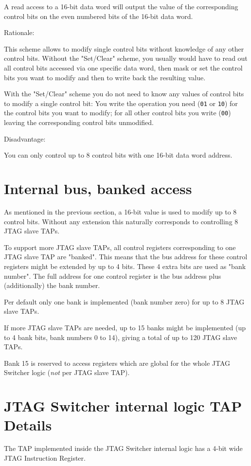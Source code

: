 \documentclass[10pt,english,a4paper]{report}
\begin{document}
A read access to a 16-bit data word will output the value of the corresponding control bits
on the even numbered bits of the 16-bit data word.

Rationale:

This scheme allows to modify single control bits without knowledge of any other control bits.
Without the "Set/Clear" scheme, you usually would have to read out all control bits
accessed via one specific data word, then mask or set the control bits you want to modify and
then to write back the resulting value.

With the "Set/Clear" scheme you do not need to know any values of control bits to modify
a single control bit: You write the operation you need ({\tt 01} or {\tt 10}) for the
control bits you want to modify; for all other control bits you write ({\tt 00}) leaving
the corresponding control bits unmodified.

Disadvantage:

You can only control up to 8 control bits with one 16-bit data word address.

\newpage
\section{Internal bus, banked access}
As mentioned in the previous section, a 16-bit value is used to modify up to 8 control bits.
Without any extension this naturally corresponds to controlling 8 JTAG slave TAPs.

To support more JTAG slave TAPs, all control registers corresponding to one JTAG slave TAP
are "banked". This means that the bus address for these control registers might be extended
by up to 4 bits. These 4 extra bits are used as "bank number". The full address
for one control register is the bus address plus (additionally) the bank number.

Per default only one bank is implemented (bank number zero) for up to 8 JTAG slave TAPs.

If more JTAG slave TAPs are needed, up to 15 banks might be implemented
(up to 4 bank bits, bank numbers 0 to 14), giving a total of up to 120 JTAG slave TAPs.

Bank 15 is reserved to access registers which are global for the whole JTAG Switcher
logic ({\em not} per JTAG slave TAP).

\section{JTAG Switcher internal logic TAP Details}
The TAP implemented inside the JTAG Switcher internal logic
has a 4-bit wide JTAG Instruction Register.
\end{document}
